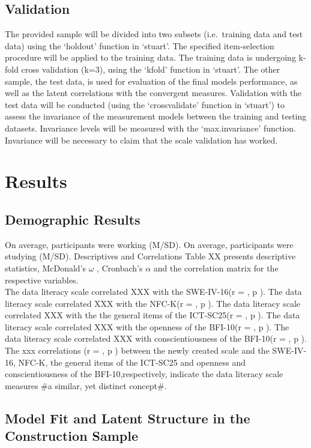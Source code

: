 \documentclass[
  12pt,
  a4paper,
  twoside]{article}
\begin{document}
\subsection{Validation}\label{validation}

The provided sample will be divided into two subsets (i.e.~training data and test data) using the `holdout' function in `stuart'. The specified item-selection procedure will be applied to the training data. The training data is undergoing k-fold cross validation (k=3), using the `kfold' function in `stuart'. The other sample, the test data, is used for evaluation of the final models performance, as well as the latent correlations with the convergent measures.
Validation with the test data will be conducted (using the `crossvalidate' function in `stuart') to assess the invariance of the measurement models between the training and testing datasets. Invariance levels will be measured with the `max.invariance' function. Invariance will be necessary to claim that the scale validation has worked.

\section{Results}\label{results}

\subsection{Demographic Results}\label{demographic-results}

On average, participants were working (M/SD). On average, participants were studying (M/SD). Descriptives and Correlations
Table XX
presents descriptive statistics, McDonald's \(\omega\) ,
Cronbach's \(\alpha\) and the correlation matrix for the respective variables.\\
The data literacy scale correlated XXX with the SWE-IV-16(r = , p ). The data literacy scale correlated XXX with the NFC-K(r = , p ). The data literacy scale correlated XXX with the the general items of the ICT-SC25(r = , p ). The data literacy scale correlated XXX with the openness of the BFI-10(r = , p ). The data literacy scale correlated XXX with conscientiousness of the BFI-10(r = , p ). The xxx correlations (r = , p ) between the newly created scale and the SWE-IV-16, NFC-K, the general items of the ICT-SC25 and openness and conscientiousness of the BFI-10,respectively, indicate the data literacy scale measures \#a similar, yet distinct concept\#.

\subsection{Model Fit and Latent Structure in the Construction Sample}\label{model-fit-and-latent-structure-in-the-construction-sample}
\end{document}
